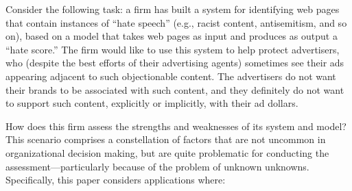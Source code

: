 Consider the following task: a firm has built a system for identifying
web pages that contain instances of ``hate speech'' (e.g., racist
content, antisemitism, and so on), based on a model that takes web
pages as input and produces as output a ``hate score.''  The firm
would like to use this system to help protect advertisers, who
(despite the best efforts of their advertising agents) sometimes see
their ads appearing adjacent to such objectionable content.  The
advertisers do not want their brands to be associated with such
content, and they definitely do not want to support such content,
explicitly or implicitly, with their ad dollars.  

How does this firm assess the strengths and weaknesses of its system
and model?  This scenario comprises a constellation of factors that
are not uncommon in organizational decision making, but are quite
problematic for conducting the assessment---particularly because of
the problem of unknown unknowns.  Specifically, this paper considers
applications where:

